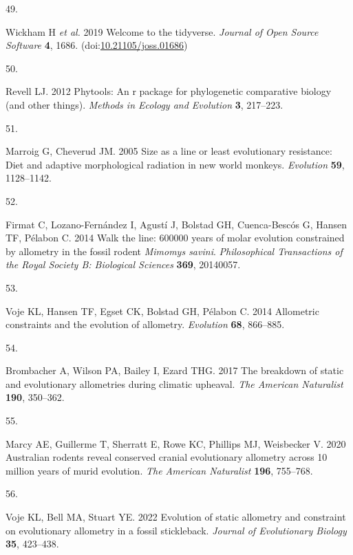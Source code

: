 \documentclass[
  11pt,
]{article}
\newlength{\cslhangindent}
\newlength{\csllabelwidth}
\newlength{\cslentryspacingunit} %
\newenvironment{CSLReferences}[2] %
 {%
  \setlength{\parindent}{0pt}
  \ifodd #1
  \let\oldpar\par
  \def\par{\hangindent=\cslhangindent\oldpar}
  \fi
  \setlength{\parskip}{#2\cslentryspacingunit}
 }%
 {}
\newcommand{\CSLLeftMargin}[1]{\parbox[t]{\csllabelwidth}{#1}}
\newcommand{\CSLRightInline}[1]{\parbox[t]{\linewidth - \csllabelwidth}{#1}\break}
\begin{document}
\begin{CSLReferences}{0}{0}
\leavevmode{}%
\CSLLeftMargin{49. }%
\CSLRightInline{Wickham H \emph{et al.} 2019 Welcome to the {tidyverse}.
\emph{Journal of Open Source Software} \textbf{4}, 1686.
(doi:\href{https://doi.org/10.21105/joss.01686}{10.21105/joss.01686})}

\leavevmode{}%
\CSLLeftMargin{50. }%
\CSLRightInline{Revell LJ. 2012 Phytools: An r package for phylogenetic
comparative biology (and other things). \emph{Methods in Ecology and
Evolution} \textbf{3}, 217--223.}

\leavevmode{}%
\CSLLeftMargin{51. }%
\CSLRightInline{Marroig G, Cheverud JM. 2005 Size as a line or least
evolutionary resistance: Diet and adaptive morphological radiation in
new world monkeys. \emph{Evolution} \textbf{59}, 1128--1142.}

\leavevmode{}%
\CSLLeftMargin{52. }%
\CSLRightInline{Firmat C, Lozano-Fernández I, Agustí J, Bolstad GH,
Cuenca-Bescós G, Hansen TF, Pélabon C. 2014 Walk the line: 600000 years
of molar evolution constrained by allometry in the fossil rodent
\emph{{M}imomys savini}. \emph{Philosophical Transactions of the Royal
Society B: Biological Sciences} \textbf{369}, 20140057.}

\leavevmode{}%
\CSLLeftMargin{53. }%
\CSLRightInline{Voje KL, Hansen TF, Egset CK, Bolstad GH, Pélabon C.
2014 Allometric constraints and the evolution of allometry.
\emph{Evolution} \textbf{68}, 866--885.}

\leavevmode{}%
\CSLLeftMargin{54. }%
\CSLRightInline{Brombacher A, Wilson PA, Bailey I, Ezard THG. 2017 The
breakdown of static and evolutionary allometries during climatic
upheaval. \emph{The American Naturalist} \textbf{190}, 350--362.}

\leavevmode{}%
\CSLLeftMargin{55. }%
\CSLRightInline{Marcy AE, Guillerme T, Sherratt E, Rowe KC, Phillips MJ,
Weisbecker V. 2020 Australian rodents reveal conserved cranial
evolutionary allometry across 10 million years of murid evolution.
\emph{The American Naturalist} \textbf{196}, 755--768.}

\leavevmode{}%
\CSLLeftMargin{56. }%
\CSLRightInline{Voje KL, Bell MA, Stuart YE. 2022 Evolution of static
allometry and constraint on evolutionary allometry in a fossil
stickleback. \emph{Journal of Evolutionary Biology} \textbf{35},
423--438.}


\end{CSLReferences}
\end{document}
